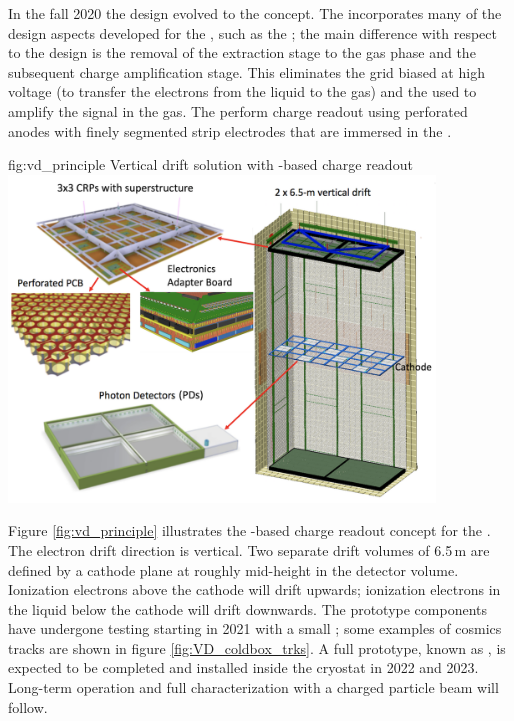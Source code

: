 \documentclass[../main-v1.tex]{subfiles}
\begin{document}
In the fall 2020 the  design evolved to the  concept. The  incorporates many of the design aspects developed for the , such as the ;   the  main  difference  with  respect  to  the    design  is   the  removal  of  the  extraction  stage  to  the  gas  phase  and  the  subsequent  charge  amplification  stage.  %
This eliminates the grid biased at high voltage (to transfer the electrons from the liquid to the gas) and the  used to amplify the signal in the gas. The   %
perform charge readout using %
perforated  anodes with finely segmented strip electrodes %
that are immersed in the .
 

\begin{dunefigure}
{fig:vd_principle}
{Vertical drift solution with -based charge readout}
\includegraphics[width=0.85\textwidth]{graphics/IntroFigures/Fig_13_VD_solution.png}
\end{dunefigure}

 Figure \ref{fig:vd_principle} illustrates the -based charge readout concept for the . The electron drift direction is vertical.
Two separate drift volumes of 6.5\,m are defined by a cathode plane at roughly mid-height in the
detector volume. Ionization electrons above the cathode will drift upwards; ionization electrons in the liquid below the cathode will drift downwards.
The   prototype components have undergone testing starting in 2021 with a small \coldbox; some examples of cosmics tracks are shown in figure \ref{fig:VD_coldbox_trks}. A full prototype, known as , is expected to be completed and  installed 
 inside the  cryostat in 2022 and 2023. Long-term operation and full characterization with a charged particle beam will follow. 
\end{document}
